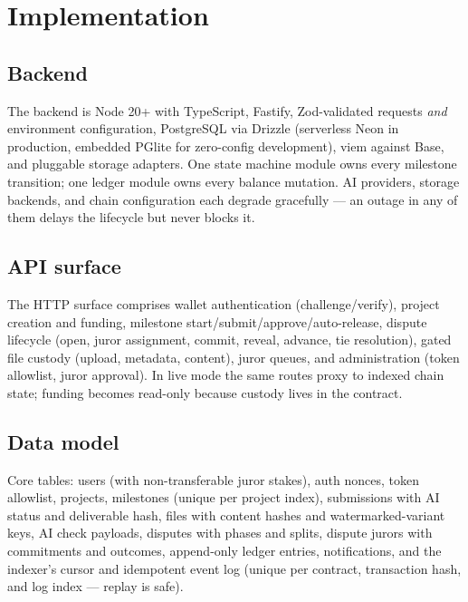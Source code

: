 \documentclass[11pt,letterpaper]{article}
\begin{document}
\section{Implementation}\label{sec:implementation}

\subsection{Backend}

The backend is Node 20+ with TypeScript, Fastify, Zod-validated requests
\emph{and} environment configuration, PostgreSQL via Drizzle (serverless Neon in
production, embedded PGlite for zero-config development), viem against Base, and
pluggable storage adapters. One state machine module owns every milestone
transition; one ledger module owns every balance mutation. AI providers, storage
backends, and chain configuration each degrade gracefully --- an outage in any of
them delays the lifecycle but never blocks it.

\subsection{API surface}

The HTTP surface comprises wallet authentication (challenge/verify), project creation
and funding, milestone start/submit/approve/auto-release, dispute lifecycle
(open, juror assignment, commit, reveal, advance, tie resolution), gated file custody
(upload, metadata, content), juror queues, and administration (token allowlist, juror
approval). In live mode the same routes proxy to indexed chain state; funding becomes
read-only because custody lives in the contract.

\subsection{Data model}

Core tables: users (with non-transferable juror stakes), auth nonces, token
allowlist, projects, milestones (unique per project index), submissions with
AI status and deliverable hash, files with content hashes and watermarked-variant
keys, AI check payloads, disputes with phases and splits, dispute jurors with
commitments and outcomes, append-only ledger entries, notifications, and the indexer's
cursor and idempotent event log (unique per contract, transaction hash, and log
index --- replay is safe).
\end{document}
